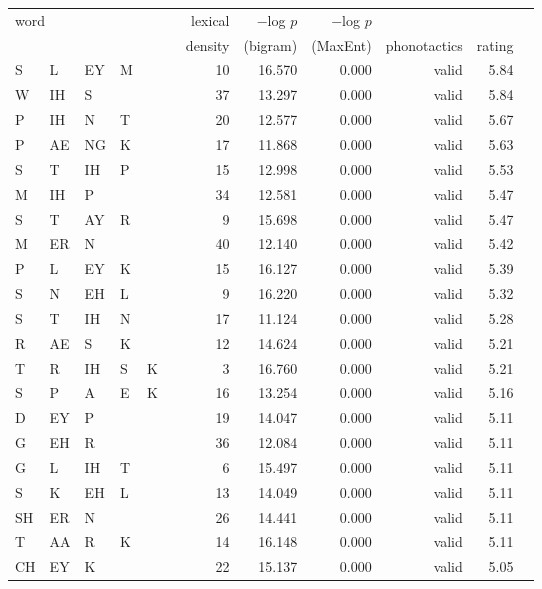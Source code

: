 \begin{longtable}{l@{ } l@{ } l@{ } l@{ } l@{ } l r r r r r r} 
\toprule
\multicolumn{6}{l}{\multirow{2}{*}{word}} & lexical & $-$log $p$ & $-$log $p$ \\
&&&&&& density & (bigram) & (MaxEnt) & phonotactics & rating \\
\midrule
S  & L  & EY & M  &    &   & 10 & 16.570 & 0.000 & valid   & 5.84 \\
W  & IH & S  &    &    &   & 37 & 13.297 & 0.000 & valid   & 5.84 \\
P  & IH & N  & T  &    &   & 20 & 12.577 & 0.000 & valid   & 5.67 \\
P  & AE & NG & K  &    &   & 17 & 11.868 & 0.000 & valid   & 5.63 \\
S  & T  & IH & P  &    &   & 15 & 12.998 & 0.000 & valid   & 5.53 \\
M  & IH & P  &    &    &   & 34 & 12.581 & 0.000 & valid   & 5.47 \\
S  & T  & AY & R  &    &   &  9 & 15.698 & 0.000 & valid   & 5.47 \\
M  & ER & N  &    &    &   & 40 & 12.140 & 0.000 & valid   & 5.42 \\
P  & L  & EY & K  &    &   & 15 & 16.127 & 0.000 & valid   & 5.39 \\
S  & N  & EH & L  &    &   &  9 & 16.220 & 0.000 & valid   & 5.32 \\
S  & T  & IH & N  &    &   & 17 & 11.124 & 0.000 & valid   & 5.28 \\
R  & AE & S  & K  &    &   & 12 & 14.624 & 0.000 & valid   & 5.21 \\
T  & R  & IH & S  & K  &   &  3 & 16.760 & 0.000 & valid   & 5.21 \\
S  & P  & A  & E  & K  &   & 16 & 13.254 & 0.000 & valid   & 5.16 \\
D  & EY & P  &    &    &   & 19 & 14.047 & 0.000 & valid   & 5.11 \\
G  & EH & R  &    &    &   & 36 & 12.084 & 0.000 & valid   & 5.11 \\
G  & L  & IH & T  &    &   &  6 & 15.497 & 0.000 & valid   & 5.11 \\
S  & K  & EH & L  &    &   & 13 & 14.049 & 0.000 & valid   & 5.11 \\
SH & ER & N  &    &    &   & 26 & 14.441 & 0.000 & valid   & 5.11 \\
T  & AA & R  & K  &    &   & 14 & 16.148 & 0.000 & valid   & 5.11 \\
CH & EY & K  &    &    &   & 22 & 15.137 & 0.000 & valid   & 5.05 \\

\end{longtable}
